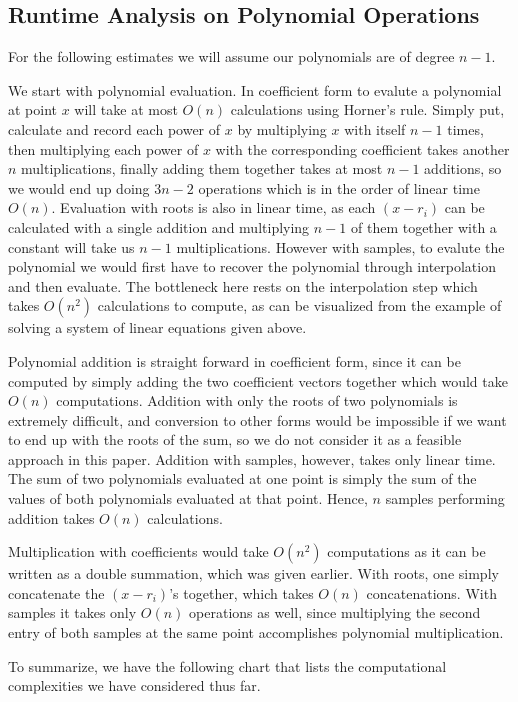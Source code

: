 \documentclass[../article.tex]{subfiles}
\begin{document}
\subsection{Runtime Analysis on Polynomial Operations}

For the following estimates we will assume our polynomials are of degree $n-1$.

We start with polynomial evaluation. In coefficient form to evalute a polynomial at point $x$ will take at most $O(n)$ calculations using Horner's rule. Simply put, calculate and record each power of $x$ by multiplying $x$ with itself $n-1$ times, then multiplying each power of $x$ with the corresponding coefficient takes another $n$ multiplications, finally adding them together takes at most $n-1$ additions, so we would end up doing $3n-2$ operations which is in the order of linear time $O(n)$. Evaluation with roots is also in linear time, as each $(x-r_i)$ can be calculated with a single addition and multiplying $n-1$ of them together with a constant will take us $n-1$ multiplications. However with samples, to evalute the polynomial we would first have to recover the polynomial through interpolation and then evaluate. The bottleneck here rests on the interpolation step which takes $O(n^2)$ calculations to compute, as can be visualized from the example of solving a system of linear equations given above.

Polynomial addition is straight forward in coefficient form, since it can be computed by simply adding the two coefficient vectors together which would take $O(n)$ computations. Addition with only the roots of two polynomials is extremely difficult, and conversion to other forms would be impossible if we want to end up with the roots of the sum, so we do not consider it as a feasible approach in this paper. Addition with samples, however, takes only linear time. The sum of two polynomials evaluated at one point is simply the sum of the values of both polynomials evaluated at that point. Hence, $n$ samples performing addition takes $O(n)$ calculations.

Multiplication with coefficients would take $O(n^2)$ computations as it can be written as a double summation, which was given earlier. With roots, one simply concatenate the $(x-r_i)$'s together, which takes $O(n)$ concatenations. With samples it takes only $O(n)$ operations as well, since multiplying the second entry of both samples at the same point accomplishes polynomial multiplication.

To summarize, we have the following chart that lists the computational complexities we have considered thus far.
\end{document}
